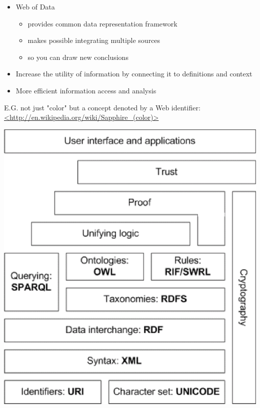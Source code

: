 \documentclass[a4paper,landscape,headrule,footrule,xetex]{foils}
\begin{document}

\begin{itemize} 
\item Web of Data
  \begin{itemize}
  \item provides common data representation framework
  \item makes possible integrating multiple sources
  \item so you can draw new conclusions
  \end{itemize}
\item  Increase the utility of information by connecting it to definitions and context
\item  More efficient information access and analysis
\end{itemize}

E.G. not just "color" but a concept denoted by a Web identifier: 
\\ \url{<http://en.wikipedia.org/wiki/Sapphire_(color)>}



\includegraphics[height=\textheight]{../pics/semantic-web-layers.eps}

\end{document}
